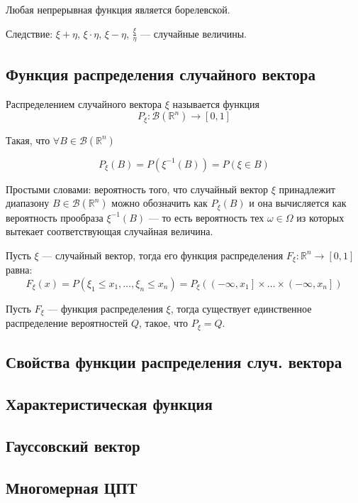 Любая непрерывная функция является борелевской.

Следствие: $\xi+\eta$, $\xi \cdot \eta$, $\xi-\eta$, $\frac{\xi}{\eta}$ --- случайные величины.

\subsection{Функция распределения случайного вектора}

\begin{definition}
    Распределением случайного вектора $\xi$ называется функция 
    \begin{equation}
        P_\xi : \mathcal{B} (\mathbb{R}^n) \rightarrow [0,1]
    \end{equation}
\end{definition}

Такая, что $\forall B \in \mathcal{B} (\mathbb{R}^n)$

\begin{equation}
    P_\xi (B) = P(\xi^{-1}(B)) = P(\xi \in B) 
\end{equation}

Простыми словами: вероятность того, что случайный вектор $\xi$ принадлежит диапазону $B \in \mathcal{B} (\mathbb{R}^n)$ можно обозначить как $P_\xi(B)$ и она вычисляется как вероятность прообраза $\xi^{-1}(B)$ --- то есть вероятность тех $\omega \in \Omega$ из которых вытекает соответствующая случайная величина.

\begin{definition}
    Пусть $\xi$ --- случайный вектор, тогда его функция распределения $F_\xi : \mathbb{R}^n \to [0,1]$ равна:
    \begin{equation}
        F_\xi(x) = P(\xi_1 \leq x_1, \ldots, \xi_n \leq x_n) = P_\xi(\left(-\infty, x_1\right] \times \ldots \times \left(-\infty, x_n\right])
    \end{equation}
\end{definition}

\begin{theorem}
    Пусть $F_\xi$ --- функция распределения $\xi$, тогда существует единственное распределение вероятностей $Q$, такое, что $P_\xi=Q$.
\end{theorem}

\subsection{Свойства функции распределения случ. вектора}

\subsection{Характеристическая функция}

\subsection{Гауссовский вектор}

\subsection{Многомерная ЦПТ}

\newpage